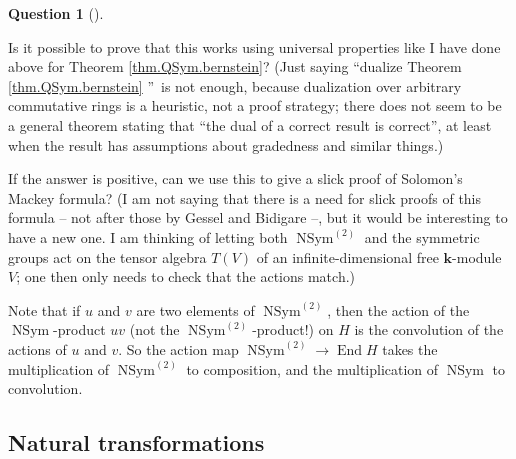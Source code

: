 \documentclass[numbers=enddot,12pt,final,onecolumn,notitlepage,abstracton]{scrartcl}%
\theoremstyle{definition}
\newtheorem{quest}[theo]{Question}
\newenvironment{question}[1][]
{\begin{quest}[#1]\begin{leftbar}}
{\end{leftbar}\end{quest}}
\newenvironment{question}[1][Question]{\noindent\textbf{#1.} }{\ \rule{0.5em}{0.5em}}
\begin{document}
\begin{question}
\label{quest.NSym}Is it possible to prove that this works using universal
properties like I have done above for Theorem \ref{thm.QSym.bernstein}? (Just
saying \textquotedblleft dualize Theorem \ref{thm.QSym.bernstein}%
\textquotedblright\ is not enough, because dualization over arbitrary
commutative rings is a heuristic, not a proof strategy; there does not seem to
be a general theorem stating that \textquotedblleft the dual of a correct
result is correct\textquotedblright, at least when the result has assumptions
about gradedness and similar things.)

If the answer is positive, can we use this to give a slick proof of Solomon's
Mackey formula? (I am not saying that there is a need for slick proofs of this
formula -- not after those by Gessel and Bidigare --, but it would be
interesting to have a new one. I am thinking of letting both
$\operatorname*{NSym}^{\left(  2\right)  }$ and the symmetric groups act on
the tensor algebra $T\left(  V\right)  $ of an infinite-dimensional free
$\mathbf{k}$-module $V$; one then only needs to check that the actions match.)
\end{question}

Note that if $u$ and $v$ are two elements of $\operatorname*{NSym}%
\nolimits^{\left(  2\right)  }$, then the action of the $\operatorname*{NSym}%
$-product $uv$ (not the $\operatorname*{NSym}\nolimits^{\left(  2\right)  }%
$-product!) on $H$ is the convolution of the actions of $u$ and $v$. So the
action map $\operatorname*{NSym}\nolimits^{\left(  2\right)  }\rightarrow
\operatorname*{End}H$ takes the multiplication of $\operatorname*{NSym}%
\nolimits^{\left(  2\right)  }$ to composition, and the multiplication of
$\operatorname*{NSym}$ to convolution.

\subsection{Natural transformations}
\end{document}
